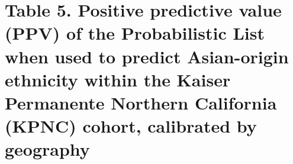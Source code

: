 \documentclass[
  landscape]{article}
\begin{document}
\begin{table}[!h]
\begin{threeparttable}
\begin{tablenotes}
\end{tablenotes}
\end{threeparttable}
\end{table}

\eject \pdfpagewidth=425mm \pdfpageheight=297mm \newpage

\hypertarget{table-5.-positive-predictive-value-ppv-of-the-probabilistic-list-when-used-to-predict-asian-origin-ethnicity-within-the-kaiser-permanente-northern-california-kpnc-cohort-calibrated-by-geography}{%
\section{Table 5. Positive predictive value (PPV) of the Probabilistic
List when used to predict Asian-origin ethnicity within the Kaiser
Permanente Northern California (KPNC) cohort, calibrated by
geography}\label{table-5.-positive-predictive-value-ppv-of-the-probabilistic-list-when-used-to-predict-asian-origin-ethnicity-within-the-kaiser-permanente-northern-california-kpnc-cohort-calibrated-by-geography}}
\end{document}

